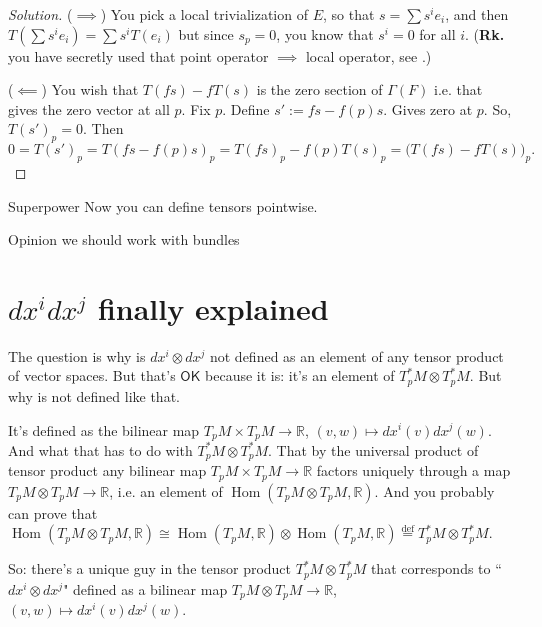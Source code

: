 \begin{proof}[Solution]\leavevmode
(\(\implies\)) You pick a local trivialization of \(E\), so that \(s=\sum s^ie_i\), and then
\(T\left(\sum s^ie_i\right)=\sum s^i T(e_i)\) but since \(s_p=0\), you know that \(s^i=0\) for all \(i\). (\textbf{Rk.}  you have secretly used that point operator \(\implies\) local operator, see \cite{tud}.)

(\(\impliedby\)) You wish that \(T(fs)-fT(s)\) is the zero section of  \(\Gamma(F)\) i.e. that gives the zero vector at all \(p\). Fix \(p\). Define \(s':=fs - f(p)s\). Gives zero at \(p\). So, \(T(s')_p=0\). Then
 \[0=T(s')_p=T(fs-f(p)s)_p=T(fs)_p-f(p)T(s)_p=\Big(T(fs)-fT(s)\Big)_p.\]

\end{proof}

\begin{thing8}{Superpower}\leavevmode
Now you can define tensors pointwise.
\end{thing8}

\begin{thing6}{Opinion}\leavevmode
we should work with bundles
\end{thing6}

\section{\(dx^idx^j\) finally explained}

The question is why is \(dx^i  \otimes dx^j\) not defined as an element of any tensor product of vector spaces. But that's  $\mathsf{OK}$ because it is: it's an element of \(T_p^*M\otimes T^*_pM\). But why is not defined like that.

It's defined as the bilinear map \(T_pM \times T_pM\to \mathbb{R}\), \((v,w)\mapsto dx^i(v)dx^j(w)\). And what that has to do with \(T_p ^*M\otimes T_p ^*M\). That by the universal product of tensor product any bilinear map \(T_pM \times T_pM\to \mathbb{R}\) factors uniquely through a map \(T_pM \otimes T_pM \to \mathbb{R}\), i.e. an element of \(\operatorname{Hom}(T_pM \otimes T_pM, \mathbb{R})\). And you probably can prove that \(\operatorname{Hom}(T_pM \otimes T_p M, \mathbb{R})\cong \operatorname{Hom}(T_pM,\mathbb{R})\otimes \operatorname{Hom}(T_pM, \mathbb{R})\overset{\operatorname{def}}{=}T_p ^*M \otimes T^*_pM\).

So: there's a unique guy in the tensor product \(T_p ^*M \otimes T^*_pM\) that corresponds to ``\(dx^i \otimes dx^j\)" defined as a bilinear map \(T_pM \otimes T_pM\to \mathbb{R}\), \((v,w)\mapsto dx^i(v)dx^j(w)\).

